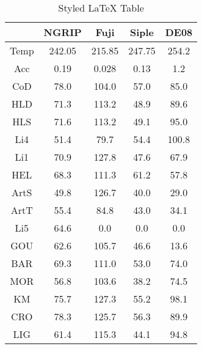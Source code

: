 \begin{table}[h]
\centering
\caption{Styled LaTeX Table}
\label{table:5}
\begin{tabular}{ccccc}
\toprule
 & NGRIP & Fuji & Siple & DE08 \\
\midrule
Temp & 242.05 & 215.85 & 247.75 & 254.2 \\
Acc & 0.19 & 0.028 & 0.13 & 1.2 \\
CoD & 78.0 & 104.0 & 57.0 & 85.0 \\
HLD & 71.3 & 113.2 & 48.9 & 89.6 \\
HLS & 71.6 & 113.2 & 49.1 & 95.0 \\
Li4 & 51.4 & 79.7 & 54.4 & 100.8 \\
Li1 & 70.9 & 127.8 & 47.6 & 67.9 \\
HEL & 68.3 & 111.3 & 61.2 & 57.8 \\
ArtS & 49.8 & 126.7 & 40.0 & 29.0 \\
ArtT & 55.4 & 84.8 & 43.0 & 34.1 \\
Li5 & 64.6 & 0.0 & 0.0 & 0.0 \\
GOU & 62.6 & 105.7 & 46.6 & 13.6 \\
BAR & 69.3 & 111.0 & 53.0 & 74.0 \\
MOR & 56.8 & 103.6 & 38.2 & 74.5 \\
KM & 75.7 & 127.3 & 55.2 & 98.1 \\
CRO & 78.3 & 125.7 & 56.3 & 89.9 \\
LIG & 61.4 & 115.3 & 44.1 & 94.8 \\
\bottomrule
\end{tabular}
\end{table}

